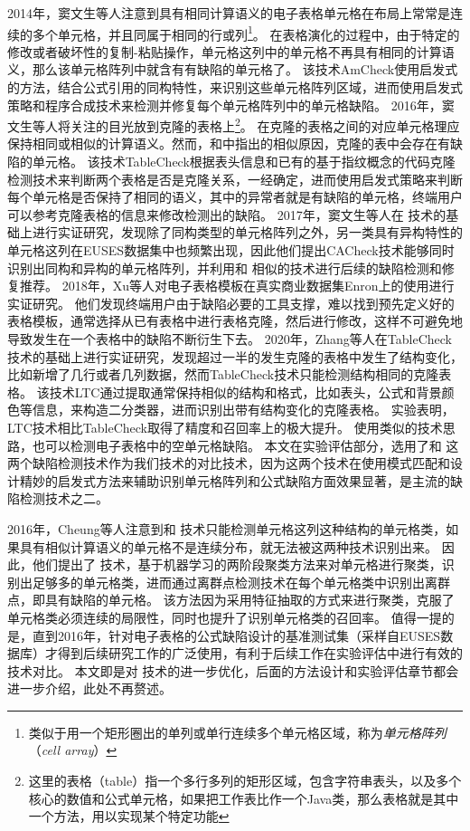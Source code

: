 2014年，窦文生等人\cite{dou2014spreadsheet}注意到具有相同计算语义的电子表格单元格在布局上常常是连续的多个单元格，并且同属于相同的行或列\footnote{类似于用一个矩形圈出的单列或单行连续多个单元格区域，称为\textit{单元格阵列}（\textit{cell array}）}。
在表格演化的过程中，由于特定的修改或者破坏性的复制-粘贴操作，单元格这列中的单元格不再具有相同的计算语义，那么该单元格阵列中就含有有缺陷的单元格了。
该技术AmCheck使用启发式的方法，结合公式引用的同构特性，来识别这些单元格阵列区域，进而使用启发式策略和程序合成技术来检测并修复每个单元格阵列中的单元格缺陷。
2016年，窦文生等人\cite{dou2016detecting}将关注的目光放到克隆的表格上\footnote{这里的表格（table）指一个多行多列的矩形区域，包含字符串表头，以及多个核心的数值和公式单元格，如果把工作表比作一个Java类，那么表格就是其中一个方法，用以实现某个特定功能}。
在克隆的表格之间的对应单元格理应保持相同或相似的计算语义。然而，和\cite{dou2014spreadsheet}中指出的相似原因，克隆的表中会存在有缺陷的单元格。
该技术TableCheck根据表头信息和已有的基于指纹概念的代码克隆检测技术来判断两个表格是否是克隆关系，一经确定，进而使用启发式策略来判断每个单元格是否保持了相同的语义，其中的异常者就是有缺陷的单元格，终端用户可以参考克隆表格的信息来修改检测出的缺陷。
2017年，窦文生等人\cite{dou2017cacheck}在 \am 技术的基础上进行实证研究，发现除了同构类型的单元格阵列之外，另一类具有异构特性的单元格这列在EUSES数据集中也频繁出现，因此他们提出CACheck技术能够同时识别出同构和异构的单元格阵列，并利用和 \am 相似的技术进行后续的缺陷检测和修复推荐。
2018年，Xu等人\cite{xu2018spreadsheet}对电子表格模板在真实商业数据集Enron上的使用进行实证研究。
他们发现终端用户由于缺陷必要的工具支撑，难以找到预先定义好的表格模板，通常选择从已有表格中进行表格克隆，然后进行修改，这样不可避免地导致发生在一个表格中的缺陷不断衍生下去。
2020年，Zhang等人\cite{zhang2020learning}在TableCheck技术的基础上进行实证研究，发现超过一半的发生克隆的表格中发生了结构变化，比如新增了几行或者几列数据，然而TableCheck技术只能检测结构相同的克隆表格。
该技术LTC通过提取通常保持相似的结构和格式，比如表头，公式和背景颜色等信息，来构造二分类器，进而识别出带有结构变化的克隆表格。
实验表明，LTC技术相比TableCheck取得了精度和召回率上的极大提升。
使用类似的技术思路，也可以检测电子表格中的空单元格缺陷\cite{xu2018detecting}。
本文在实验评估部分，选用了\am 和 \ca 这两个缺陷检测技术作为我们\wa 技术的对比技术，因为这两个技术在使用模式匹配和设计精妙的启发式方法来辅助识别单元格阵列和公式缺陷方面效果显著，是主流的缺陷检测技术之二。

2016年，Cheung等人\cite{cheung2016custodes}注意到\am 和 \ca 技术只能检测单元格这列这种结构的单元格类，如果具有相似计算语义的单元格不是连续分布，就无法被这两种技术识别出来。
因此，他们提出了 \cu 技术，基于机器学习的两阶段聚类方法来对单元格进行聚类，识别出足够多的单元格类，进而通过离群点检测技术在每个单元格类中识别出离群点，即具有缺陷的单元格。
该方法因为采用特征抽取的方式来进行聚类，克服了单元格类必须连续的局限性，同时也提升了识别单元格类的召回率。
值得一提的是，直到2016年，针对电子表格的公式缺陷设计的基准测试集（采样自EUSES数据库）才得到后续研究工作的广泛使用，有利于后续工作\cite{singh2017melford,Barowy2018excelint}在实验评估中进行有效的技术对比。
本文即是对 \cu 技术的进一步优化，后面的方法设计和实验评估章节都会进一步介绍，此处不再赘述。

